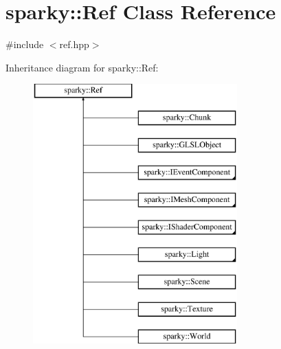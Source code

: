 \hypertarget{classsparky_1_1_ref}{}\section{sparky\+:\+:Ref Class Reference}
\label{classsparky_1_1_ref}


{\ttfamily \#include $<$ref.\+hpp$>$}

Inheritance diagram for sparky\+:\+:Ref\+:\begin{figure}[H]
\begin{center}
\leavevmode
\includegraphics[height=10.000000cm]{classsparky_1_1_ref}
\end{center}
\end{figure}
